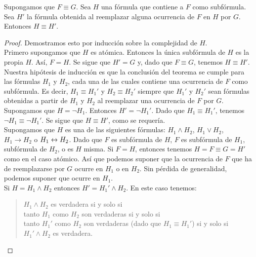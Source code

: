 \message{ !name(main.tex)}\documentclass[12pt,a4paper]{book}
\begin{document}
    \begin{teorema}\label{thm:sustitucion}
        Supongamos que $F\equiv G$. Sea $H$ una fórmula que contiene a $F$ como subfórmula. Sea $H'$ la fórmula obtenida al
        reemplazar alguna ocurrencia de $F$ en $H$ por $G$. Entonces $H\equiv H'$.
    \end{teorema}
    \begin{proof}
        Demostramos esto por inducción sobre la complejidad de $H$.\\
        Primero supongamos que $H$ es atómica. Entonces la única subfórmula de $H$ es la propia $H$. Así, $F=H$. Se sigue que
        $H'=G$ y, dado que $F\equiv G$, tenemos $H\equiv H'$.\\
        Nuestra hipótesis de inducción es que la conclusión del teorema se cumple para las fórmulas $H_{1}$ y $H_{2}$, cada una
        de las cuales contiene una ocurrencia de $F$ como subfórmula. Es decir, $H_{1}\equiv H_{1}'$ y $H_{2}\equiv H_{2}'$
        siempre que $H_{1}'$ y $H_{2}'$ sean fórmulas obtenidas a partir de $H_{1}$ y $H_{2}$ al reemplazar una ocurrencia de
        $F$ por $G$.\\
        Supongamos que $H=\neg H_{1}$. Entonces $H'=\neg H_{1}'$. Dado que $H_{1}\equiv H_{1}'$, tenemos $\neg H_{1}\equiv\neg H_{1}'$.
        Se sigue que $H\equiv H'$, como se requería.\\
        Supongamos que $H$ es una de las siguientes fórmulas: $H_{1}\wedge H_{2}$, $H_{1}\vee H_{2}$, $H_{1}\rightarrow H_{2}$ o
        $H_{1}\leftrightarrow H_{2}$. Dado que $F$ es subfórmula de $H$, $F$ es subfórmula de $H_{1}$, subfórmula de $H_{2}$, o es $H$
        misma. Si $F=H$, entonces tenemos $H=F\equiv G=H'$ como en el caso atómico. Así que podemos suponer que la ocurrencia
        de $F$ que ha de reemplazarse por $G$ ocurre en $H_{1}$ o en $H_{2}$. Sin pérdida de generalidad, podemos suponer que
        ocurre en $H_{1}$.\\
        Si $H=H_{1}\wedge H_{2}$ entonces $H'=H_{1}'\wedge H_{2}$. En este caso tenemos:
        \begin{quote}
            $H_{1}\wedge H_{2}$ es verdadera si y solo si\\
            tanto $H_{1}$ como $H_{2}$ son verdaderas si y solo si\\
            tanto $H_{1}'$ como $H_{2}$ son verdaderas (dado que $H_{1}\equiv H_{1}'$) si y solo si\\
            $H_{1}'\wedge H_{2}$ es verdadera.
        \end{quote}

\end{proof}
\end{document}

